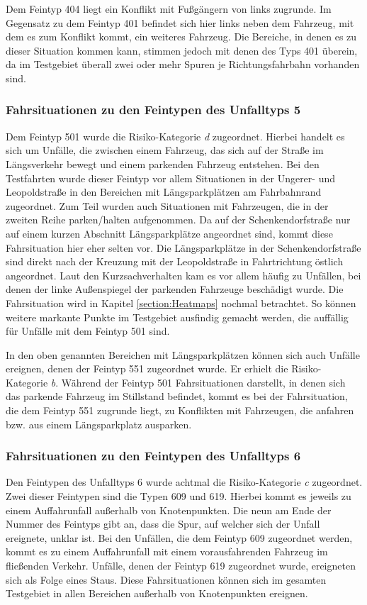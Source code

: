 Dem Feintyp 404 liegt ein Konflikt mit Fußgängern von links zugrunde. Im Gegensatz zu dem Feintyp 401 befindet sich hier links neben dem Fahrzeug, mit dem es zum Konflikt kommt, ein weiteres Fahrzeug. Die Bereiche, in denen es zu dieser Situation kommen kann, stimmen jedoch mit denen des Typs 401 überein, da im Testgebiet überall zwei oder mehr Spuren je Richtungsfahrbahn vorhanden sind. 

\subsubsection{Fahrsituationen zu den Feintypen des Unfalltyps 5}
Dem Feintyp 501 wurde die Risiko-Kategorie \textit{d} zugeordnet. Hierbei handelt es sich um Unfälle, die zwischen einem Fahrzeug, das sich auf der Straße im Längsverkehr bewegt und einem parkenden Fahrzeug entstehen. Bei den Testfahrten wurde dieser Feintyp vor allem Situationen in der Ungerer- und Leopoldstraße in den Bereichen mit Längsparkplätzen am Fahrbahnrand zugeordnet.  Zum Teil wurden auch Situationen mit Fahrzeugen, die in der zweiten Reihe parken/halten aufgenommen. Da auf der Schenkendorfstraße nur auf einem kurzen Abschnitt Längsparkplätze angeordnet sind, kommt diese Fahrsituation hier eher selten vor. Die Längsparkplätze in der Schenkendorfstraße sind direkt nach der Kreuzung mit der Leopoldstraße in Fahrtrichtung östlich angeordnet. Laut den Kurzsachverhalten kam es vor allem häufig zu Unfällen, bei denen der linke Außenspiegel der parkenden Fahrzeuge beschädigt wurde. Die Fahrsituation wird in Kapitel \ref{section:Heatmaps} nochmal betrachtet. So können weitere markante Punkte im Testgebiet ausfindig gemacht werden, die auffällig für Unfälle mit dem Feintyp 501 sind.

In den oben genannten Bereichen mit Längsparkplätzen können sich auch Unfälle ereignen, denen der Feintyp 551 zugeordnet wurde. Er erhielt die Risiko-Kategorie \textit{b}. Während der Feintyp 501 Fahrsituationen darstellt, in denen sich das parkende Fahrzeug im Stillstand befindet, kommt es bei der Fahrsituation, die dem Feintyp 551 zugrunde liegt, zu Konflikten mit Fahrzeugen, die anfahren bzw. aus einem Längsparkplatz ausparken.

\subsubsection{Fahrsituationen zu den Feintypen des Unfalltyps 6}
Den Feintypen des Unfalltyps 6 wurde achtmal die Risiko-Kategorie \textit{c} zugeordnet. Zwei dieser Feintypen sind die Typen 609 und 619. Hierbei kommt es jeweils zu einem Auffahrunfall außerhalb von Knotenpunkten. Die neun am Ende der Nummer des Feintyps gibt an, dass die Spur, auf welcher sich der Unfall ereignete, unklar ist. Bei den Unfällen, die dem Feintyp 609 zugeordnet werden, kommt es zu einem Auffahrunfall mit einem vorausfahrenden Fahrzeug im fließenden Verkehr. Unfälle, denen der Feintyp 619 zugeordnet wurde, ereigneten sich als Folge eines Staus. Diese Fahrsituationen können sich im gesamten Testgebiet in allen Bereichen außerhalb von Knotenpunkten ereignen.

